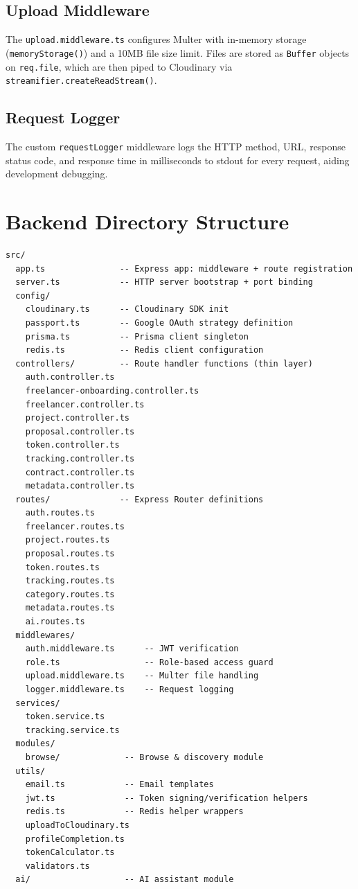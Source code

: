 \subsection{Upload Middleware}

The \texttt{upload.middleware.ts} configures Multer with in-memory storage (\texttt{memoryStorage()}) and a 10MB file size limit. Files are stored as \texttt{Buffer} objects on \texttt{req.file}, which are then piped to Cloudinary via \texttt{streamifier.createReadStream()}.

\subsection{Request Logger}

The custom \texttt{requestLogger} middleware logs the HTTP method, URL, response status code, and response time in milliseconds to stdout for every request, aiding development debugging.

\section{Backend Directory Structure}

\begin{lstlisting}[caption={Backend Directory Structure (ASCII)}]
src/
  app.ts               -- Express app: middleware + route registration
  server.ts            -- HTTP server bootstrap + port binding
  config/
    cloudinary.ts      -- Cloudinary SDK init
    passport.ts        -- Google OAuth strategy definition
    prisma.ts          -- Prisma client singleton
    redis.ts           -- Redis client configuration
  controllers/         -- Route handler functions (thin layer)
    auth.controller.ts
    freelancer-onboarding.controller.ts
    freelancer.controller.ts
    project.controller.ts
    proposal.controller.ts
    token.controller.ts
    tracking.controller.ts
    contract.controller.ts
    metadata.controller.ts
  routes/              -- Express Router definitions
    auth.routes.ts
    freelancer.routes.ts
    project.routes.ts
    proposal.routes.ts
    token.routes.ts
    tracking.routes.ts
    category.routes.ts
    metadata.routes.ts
    ai.routes.ts
  middlewares/
    auth.middleware.ts      -- JWT verification
    role.ts                 -- Role-based access guard
    upload.middleware.ts    -- Multer file handling
    logger.middleware.ts    -- Request logging
  services/
    token.service.ts
    tracking.service.ts
  modules/
    browse/             -- Browse & discovery module
  utils/
    email.ts            -- Email templates
    jwt.ts              -- Token signing/verification helpers
    redis.ts            -- Redis helper wrappers
    uploadToCloudinary.ts
    profileCompletion.ts
    tokenCalculator.ts
    validators.ts
  ai/                   -- AI assistant module
\end{lstlisting}

